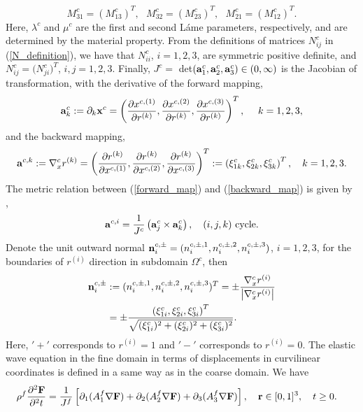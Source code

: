 \[ M_{31}^c = (M_{13}^c)^T, \ \ \  M_{32}^c =(M_{23}^c)^T, \ \ \ M_{21}^c =(M_{12}^c)^T.\]
Here, $\lambda^c$ and $\mu^c$ are the first and second L{\' {a}}me parameters, respectively, and are determined by the material property. From the definitions of matrices $N_{ij}^c$ in (\ref{N_definition}), we have that $N_{ii}^c$, $i = 1,2,3$, are symmetric positive definite, and $N_{ij}^c=\big(N_{ji}^c\big)^T$, $i,j=1,2,3$. Finally, $J^c =$ \mbox{det}$\left({\bf a}^c_1,{\bf a}^c_2,{\bf a}^c_3\right)\in (0,\infty)$ is the Jacobian of transformation, with the derivative of the forward mapping, 
\begin{equation}\label{forward_map}
{\bf a}_k^c := \partial_k{\bf x}^c  = \left(\frac{\partial x^{c,(1)}}{\partial r^{(k)}},\frac{\partial x^{c,(2)}}{\partial r^{(k)}},\frac{\partial x^{c,(3)}}{\partial r^{(k)}}\right)^T,\ \ \ \ k = 1,2,3,
\end{equation}
and the backward mapping,
\begin{equation}\label{backward_map}
{\bf a}^{c,k} := \nabla_x^c r^{(k)} = \left(\frac{\partial r^{(k)}}{\partial x^{c,(1)}},\frac{\partial r^{(k)}}{\partial x^{c,(2)}},\frac{\partial r^{(k)}}{\partial x^{c,(3)}}\right)^T := \left(\xi_{1k}^c,\xi_{2k}^c,\xi_{3k}^c\right)^T,\ \ \ k = 1,2,3.
\end{equation}
 The metric relation between (\ref{forward_map}) and (\ref{backward_map}) is given by \cite{thompson1985numerical},
\begin{equation*}
{\bf a}^{c,i} = \frac{1}{J^c}\left({\bf a}_j^c\times{\bf a}_k^c\right), \ \ \ (i,j,k) \ \mbox{cycle}.
\end{equation*}
Denote the unit outward normal ${\bf n}_i^{c,\pm} = (n_i^{c,\pm,1},n_i^{c,\pm,2},n_i^{c,\pm,3})$, $i = 1,2,3$, for the boundaries of $r^{(i)}$ direction in subdomain $\Omega^c$, then
\begin{align}\label{outward_normal}
{\bf n}_i^{c,\pm} &:= (n^{c,\pm,1}_i,n^{c,\pm,2}_i,n^{c,\pm,3}_i)^T = \pm \frac{\nabla_x^c r^{(i)}}{\left|\nabla_x^c r^{(i)}\right|} \nonumber\\
&= \pm\frac{ \left(\xi_{1i}^c,\xi_{2i}^c,\xi_{3i}^c\right)^T}{\sqrt{(\xi_{1i}^c)^2+(\xi_{2i}^c)^2+(\xi_{3i}^c)^2}}.
\end{align}
Here, $'+'$ corresponds to $r^{(i)} = 1$ and $'-'$ corresponds to $r^{(i)} = 0$. The elastic wave equation in the fine domain in terms of displacements in curvilinear coordinates is defined in a same way as in the  coarse domain. We have 
\begin{align}\label{elastic_curvi_f}
	\rho^f\frac{\partial^2{\bf F}}{\partial^2 t} &= \frac{1}{J^f}\left[\partial_1(A_1^f\nabla{\bf F}) + \partial_2(A_2^f\nabla{\bf F}) +\partial_3(A_3^f\nabla{\bf F}) \right], \ \ \  {\bf r}\in [0,1]^3,\ \ \  t\geq0.
\end{align}

